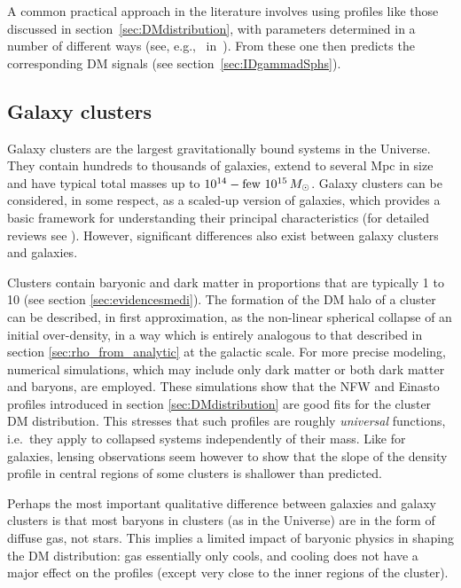 A common practical approach in the literature involves using profiles like those discussed
in section~\ref{sec:DMdistribution}, with parameters determined in a number of different ways (see, e.g.,~ in~\cite{Jdwarfs}). From these one then predicts the corresponding DM signals (see section~\ref{sec:IDgammadSphs}).



\subsection{Galaxy clusters}\label{sec:clusters}
Galaxy clusters are the largest gravitationally bound systems in the Universe. 
They contain hundreds to thousands of galaxies, extend to several Mpc in size and have typical total masses up to $10^{14}- {\rm few}\ 10^{15}\, M_\odot$.
Galaxy clusters can be considered, in some respect, as a scaled-up version of galaxies, 
which provides a basic framework for understanding their principal characteristics (for detailed reviews see \cite{DMclusters}). 
However, significant differences also exist between galaxy clusters and galaxies.

\smallskip

Clusters contain baryonic and dark matter in proportions that are typically 1 to 10  (see section \ref{sec:evidencesmedi}). 
The formation of the DM halo of a cluster can be described, in first approximation, as the non-linear spherical collapse of an initial over-density, in a way which is entirely analogous to that described in section \ref{sec:rho_from_analytic} at the galactic scale. 
For more precise modeling, numerical simulations, which may include only dark matter or both dark matter and baryons, are employed.
These simulations show that the NFW and Einasto profiles introduced in section \ref{sec:DMdistribution} are good fits for the cluster DM distribution. 
This stresses that such profiles are roughly {\em universal} functions, i.e.~they apply to collapsed systems independently of their mass.
Like for galaxies, lensing observations seem however to show that the slope of the density profile in central regions of some clusters is shallower than predicted. 

\smallskip

Perhaps the most important qualitative difference between galaxies and galaxy clusters is that most baryons in clusters (as in the Universe) are in the form of diffuse gas, not stars. 
This implies a limited impact of baryonic physics in shaping the DM distribution: gas essentially only cools, and cooling does not have a major effect on the profiles (except very close to the inner regions of the cluster). 



